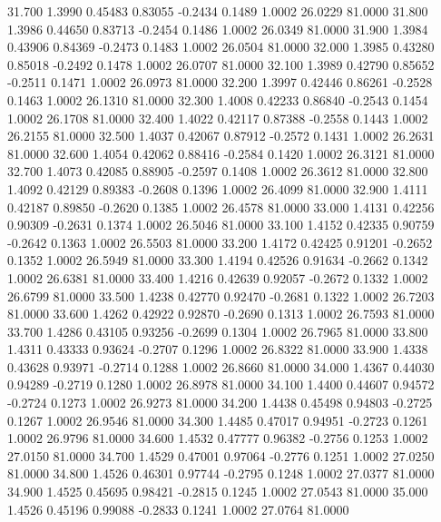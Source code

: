   31.700   1.3990   0.45483   0.83055  -0.2434   0.1489   1.0002  26.0229  81.0000
  31.800   1.3986   0.44650   0.83713  -0.2454   0.1486   1.0002  26.0349  81.0000
  31.900   1.3984   0.43906   0.84369  -0.2473   0.1483   1.0002  26.0504  81.0000
  32.000   1.3985   0.43280   0.85018  -0.2492   0.1478   1.0002  26.0707  81.0000
  32.100   1.3989   0.42790   0.85652  -0.2511   0.1471   1.0002  26.0973  81.0000
  32.200   1.3997   0.42446   0.86261  -0.2528   0.1463   1.0002  26.1310  81.0000
  32.300   1.4008   0.42233   0.86840  -0.2543   0.1454   1.0002  26.1708  81.0000
  32.400   1.4022   0.42117   0.87388  -0.2558   0.1443   1.0002  26.2155  81.0000
  32.500   1.4037   0.42067   0.87912  -0.2572   0.1431   1.0002  26.2631  81.0000
  32.600   1.4054   0.42062   0.88416  -0.2584   0.1420   1.0002  26.3121  81.0000
  32.700   1.4073   0.42085   0.88905  -0.2597   0.1408   1.0002  26.3612  81.0000
  32.800   1.4092   0.42129   0.89383  -0.2608   0.1396   1.0002  26.4099  81.0000
  32.900   1.4111   0.42187   0.89850  -0.2620   0.1385   1.0002  26.4578  81.0000
  33.000   1.4131   0.42256   0.90309  -0.2631   0.1374   1.0002  26.5046  81.0000
  33.100   1.4152   0.42335   0.90759  -0.2642   0.1363   1.0002  26.5503  81.0000
  33.200   1.4172   0.42425   0.91201  -0.2652   0.1352   1.0002  26.5949  81.0000
  33.300   1.4194   0.42526   0.91634  -0.2662   0.1342   1.0002  26.6381  81.0000
  33.400   1.4216   0.42639   0.92057  -0.2672   0.1332   1.0002  26.6799  81.0000
  33.500   1.4238   0.42770   0.92470  -0.2681   0.1322   1.0002  26.7203  81.0000
  33.600   1.4262   0.42922   0.92870  -0.2690   0.1313   1.0002  26.7593  81.0000
  33.700   1.4286   0.43105   0.93256  -0.2699   0.1304   1.0002  26.7965  81.0000
  33.800   1.4311   0.43333   0.93624  -0.2707   0.1296   1.0002  26.8322  81.0000
  33.900   1.4338   0.43628   0.93971  -0.2714   0.1288   1.0002  26.8660  81.0000
  34.000   1.4367   0.44030   0.94289  -0.2719   0.1280   1.0002  26.8978  81.0000
  34.100   1.4400   0.44607   0.94572  -0.2724   0.1273   1.0002  26.9273  81.0000
  34.200   1.4438   0.45498   0.94803  -0.2725   0.1267   1.0002  26.9546  81.0000
  34.300   1.4485   0.47017   0.94951  -0.2723   0.1261   1.0002  26.9796  81.0000
  34.600   1.4532   0.47777   0.96382  -0.2756   0.1253   1.0002  27.0150  81.0000
  34.700   1.4529   0.47001   0.97064  -0.2776   0.1251   1.0002  27.0250  81.0000
  34.800   1.4526   0.46301   0.97744  -0.2795   0.1248   1.0002  27.0377  81.0000
  34.900   1.4525   0.45695   0.98421  -0.2815   0.1245   1.0002  27.0543  81.0000
  35.000   1.4526   0.45196   0.99088  -0.2833   0.1241   1.0002  27.0764  81.0000
